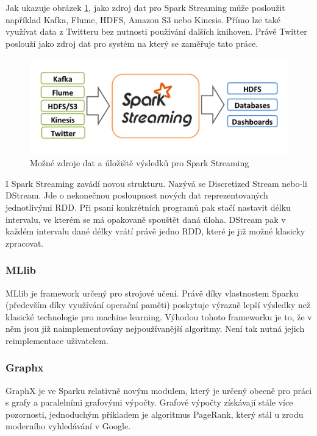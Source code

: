 \documentclass[thesis=B,czech]{FITthesis}[2012/06/26]
\begin{document}
	Jak ukazuje obrázek \ref{fig:spark_streaming_arch}, jako zdroj dat pro Spark Streaming může posloužit například Kafka, Flume, HDFS, Amazon S3 nebo Kinesis. Přímo lze také využívat data z Twitteru bez nutnosti používání dalších knihoven. Právě Twitter poslouží jako zdroj dat pro systém na který se zaměřuje tato práce.  

	\begin{figure}[ht]
    	\centering
    	\includegraphics[width=1\textwidth]{images/spark-streaming-arch.png}
    	\caption{Možné zdroje dat a úložiště výsledků pro Spark Streaming\cite{streaming-guide}}
    	\label{fig:spark_streaming_arch}
	\end{figure}
	
	I Spark Streaming zavádí novou strukturu. Nazývá se Discretized Stream nebo-li DStream. Jde o nekonečnou posloupnost nových dat reprezentovaných jednotlivými RDD. Při psaní konkrétních programů pak stačí nastavit délku intervalu, ve kterém se má opakovaně spouštět daná úloha. DStream pak v každém intervalu dané délky vrátí právě jedno RDD, které je již možné klasicky zpracovat. 
	

\subsubsection{MLlib}
	MLlib je framework určený pro strojové učení. Právě díky vlastnostem Sparku (především díky využívání operační paměti) poskytuje výrazně lepší výsledky než klasické technologie pro machine learning. Výhodou tohoto frameworku je to, že v něm jsou již naimplementovány nejpoužívanější algoritmy. Není tak nutná jejich reimplementace uživatelem. 

	
\subsubsection{Graphx}
	GraphX je ve Sparku relativně novým modulem, který je určený obecně pro práci s grafy a paralelními grafovými výpočty. Grafové výpočty získávají stále více pozornosti, jednoduchým příkladem je algoritmus PageRank, který stál u zrodu moderního vyhledávání v Google\cite{google-pagerank}. 
	
\end{document}
